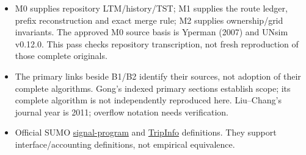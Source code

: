 \documentclass[10pt,a4paper]{article}
\begin{document}
\begin{itemize}
\item M0 supplies repository LTM/history/TST; M1 supplies the route ledger,
prefix reconstruction and exact merge rule; M2 supplies ownership/grid
invariants. The approved M0 source basis is Yperman (2007) and UNsim
v0.12.0. This pass checks repository transcription, not fresh reproduction
of those complete originals.
\item The primary links beside B1/B2 identify their sources, not adoption
of their complete algorithms. Gong's indexed primary sections establish
scope; its complete algorithm is not independently reproduced here.
Liu--Chang's journal year is 2011; overflow notation needs verification.
\item Official SUMO
\href{https://sumo.dlr.de/docs/Simulation/Traffic_Lights.html}{signal-program}
and \href{https://sumo.dlr.de/docs/Simulation/Output/TripInfo.html}{TripInfo}
definitions.
They support interface/accounting definitions, not empirical equivalence.
\end{itemize}
\end{document}
